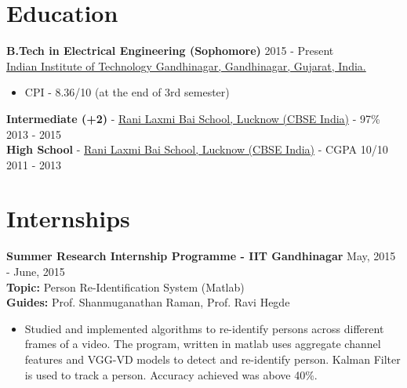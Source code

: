 \documentclass[margin, centered]{res}
\begin{document}
\begin{resume}

\section{Education}
\textbf{B.Tech in Electrical Engineering (Sophomore)} \hfill 2015 - Present
\\
\href{http://www.iitgn.ac.in/}{Indian Institute of Technology Gandhinagar, Gandhinagar, Gujarat, India.}
\begin{itemize}
\item CPI - 8.36/10 (at the end of 3rd semester)
\end{itemize}
\textbf{Intermediate (+2)} - \href{http://www.rlbschools.org/}{Rani Laxmi Bai School, Lucknow (CBSE India)} - 97\% \hfill 2013 - 2015
\\
\textbf{High School} - \href{http://www.rlbschools.org/}{Rani Laxmi Bai School, Lucknow (CBSE India)} - CGPA 10/10 \hfill 2011 - 2013


\section{Internships}
\textbf{Summer Research Internship Programme - IIT Gandhinagar} \hfill May, 2015 - June, 2015
\\
{\bf Topic: }Person Re-Identification System (Matlab)
\\
{\bf Guides: }Prof. Shanmuganathan Raman, Prof. Ravi Hegde
\vspace{1mm}
\begin{itemize}
\item Studied and implemented algorithms to re-identify persons across different frames of a video. The program, written in matlab uses aggregate channel features and VGG-VD models to detect and re-identify person. Kalman Filter is used to track a person. Accuracy achieved was above 40\%.
\end{itemize}


\end{resume}
\end{document}
